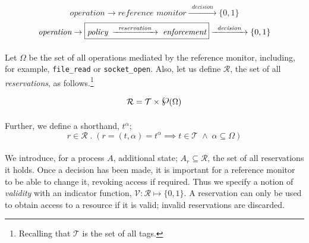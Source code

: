 \begin{equation}\label{eqn:res-1}
    \textit{operation} \rightarrow \boxed{\textit{reference monitor}} \xrightarrow{\;\;\textit{decision}\;\;} \{0,1\}
\end{equation}
\vspace{-3mm}
\begin{equation}\label{eqn:res-2}
    \textit{operation} \rightarrow \boxed{\textit{policy}\; \xrightarrow{\;\;\textit{reservation}\;\;} \;\textit{enforcement}} \xrightarrow{\;\;\textit{decision}\;\;} \{0,1\}
    \vspace{3mm}
\end{equation}


\paragraph{} Let $\Omega$ be the set of all operations mediated by the reference monitor, including, for example, \texttt{file\_read} or \texttt{socket\_open}. Also, let us define $\mathcal{R}$, the set of all \textit{reservations}, as follows.\footnote{Recalling that $\mathcal{T}$ is the set of all tags.}

\newcommand{\powerset}{\raisebox{.15\baselineskip}{\Large\ensuremath{\wp}}}
\vspace{-7mm}
\begin{equation*}
    \mathcal{R} = \mathcal{T} \times \powerset(\Omega)
    \vspace{2mm}
\end{equation*}

\paragraph{} Further, we define a shorthand, $t^{\alpha}$;
\vspace{-3mm}
\begin{equation*}
    r \in \mathcal{R} \;.\; (r = (t, \alpha) = t^{\alpha} \implies t \in \mathcal{T} \; \wedge \; \alpha \subseteq \Omega)
\end{equation*}

\paragraph{} We introduce, for a process $A$, additional state; $A_{r} \subseteq \mathcal{R}$, the set of all reservations it holds. Once a decision has been made, it is important for a reference monitor to be able to change it, revoking access if required. Thus we specify a notion of \textit{validity} with an indicator function, $\mathcal{V}: \mathcal{R} \mapsto \{0,1\}$. A reservation can only be used to obtain access to a resource if it is valid; invalid reservations are discarded.

